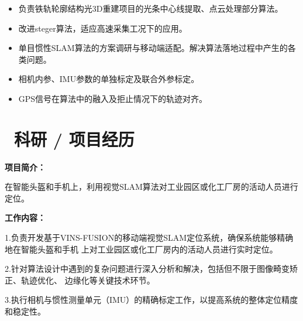 \documentclass{resume}
\begin{document}
\begin{itemize}
  \item 负责铁轨轮廓结构光3D重建项目的光条中心线提取、点云处理部分算法。
  \item 改进steger算法，适应高速采集工况下的应用。
\end{itemize}

\begin{itemize}
    \item 单目惯性SLAM算法的方案调研与移动端适配。解决算法落地过程中产生的各类问题。
    \item 相机内参、IMU参数的单独标定及联合外参标定。
    \item GPS信号在算法中的融入及拒止情况下的轨迹对齐。
\end{itemize}



\section{\textcolor[RGB]{50,50,190}{\faUsers\ 科研 / 项目经历}}



\textbf{\textcolor[RGB]{80,100,190}{项目简介：}}

\hspace{20pt} 在智能头盔和手机上，利用视觉SLAM算法对工业园区或化工厂房的活动人员进行定位。

\textbf{\textcolor[RGB]{80,100,190}{工作内容：}} 

\hspace{20pt} 1.负责开发基于VINS-FUSION的移动端视觉SLAM定位系统，确保系统能够精确地在智能头盔和手机
上对工业园区或化工厂房内的活动人员进行实时定位。

\hspace{20pt} 2.针对算法设计中遇到的复杂问题进行深入分析和解决，包括但不限于图像畸变矫正、轨迹优化、
边缘化等关键技术环节。

\hspace{20pt} 3.执行相机与惯性测量单元（IMU）的精确标定工作，以提高系统的整体定位精度和稳定性。 
\end{document}
